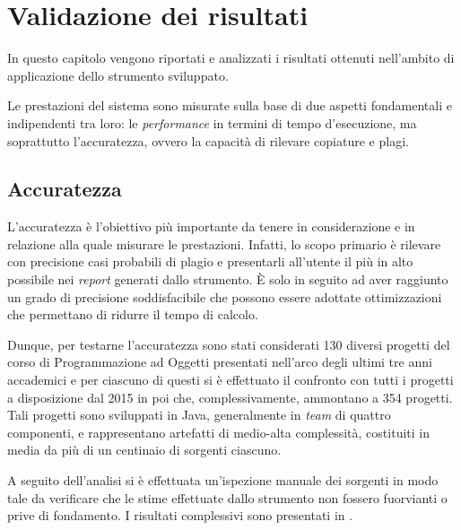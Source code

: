 \chapter{Validazione dei risultati}
\label{chapter:validation}
In questo capitolo vengono riportati e analizzati i risultati ottenuti nell'ambito di applicazione dello strumento sviluppato.

\vspace*{0.5cm}

Le prestazioni del sistema sono misurate sulla base di due aspetti fondamentali e indipendenti tra loro: le \textit{performance} in termini di tempo d'esecuzione, ma soprattutto l'accuratezza, ovvero la capacità di rilevare copiature e plagi.

\section{Accuratezza}
L'accuratezza è l'obiettivo più importante da tenere in considerazione e in relazione alla quale misurare le prestazioni.
%
Infatti, lo scopo primario è rilevare con precisione casi probabili di plagio e presentarli all'utente il più in alto possibile nei \textit{report} generati dallo strumento.
%
\`E solo in seguito ad aver raggiunto un grado di precisione soddisfacibile che possono essere adottate ottimizzazioni che permettano di ridurre il tempo di calcolo.

Dunque, per testarne l'accuratezza sono stati considerati 130 diversi progetti del corso di Programmazione ad Oggetti presentati nell'arco degli ultimi tre anni accademici e per ciascuno di questi si è effettuato il confronto con tutti i progetti a disposizione dal 2015 in poi che, complessivamente, ammontano a 354 progetti.
%
Tali progetti sono sviluppati in Java, generalmente in \textit{team} di quattro componenti, e rappresentano artefatti di medio-alta complessità, costituiti in media da più di un centinaio di sorgenti ciascuno.

A seguito dell'analisi si è effettuata un'ispezione manuale dei sorgenti in modo tale da verificare che le stime effettuate dallo strumento non fossero fuorvianti o prive di fondamento.
%
I risultati complessivi sono presentati in .

